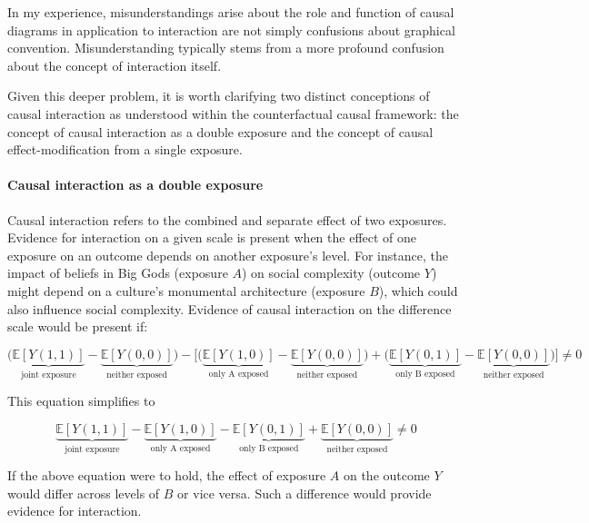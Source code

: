 \documentclass[
  singlecolumn,
  9pt]{article}
\let\oldparagraph\paragraph
\renewcommand{\paragraph}[1]{\oldparagraph{#1}\mbox{}}
\begin{document}
In my experience, misunderstandings arise about the role and function of
causal diagrams in application to interaction are not simply confusions
about graphical convention. Misunderstanding typically stems from a more
profound confusion about the concept of interaction itself.

Given this deeper problem, it is worth clarifying two distinct
conceptions of causal interaction as understood within the
counterfactual causal framework: the concept of causal interaction as a
double exposure and the concept of causal effect-modification from a
single exposure.

\paragraph{\texorpdfstring{\textbf{Causal interaction as a double
exposure}}{Causal interaction as a double exposure}}\label{causal-interaction-as-a-double-exposure}

Causal interaction refers to the combined and separate effect of two
exposures. Evidence for interaction on a given scale is present when the
effect of one exposure on an outcome depends on another exposure's
level. For instance, the impact of beliefs in Big Gods (exposure \(A\))
on social complexity (outcome \(Y\)) might depend on a culture's
monumental architecture (exposure \(B\)), which could also influence
social complexity. Evidence of causal interaction on the difference
scale would be present if:

\[\bigg(\underbrace{\mathbb{E}[Y(1,1)]}_{\text{joint exposure}} - \underbrace{\mathbb{E}[Y(0,0)]}_{\text{neither exposed}}\bigg) - \bigg[ \bigg(\underbrace{\mathbb{E}[Y(1,0)]}_{\text{only A exposed}} - \underbrace{\mathbb{E}[Y(0,0)]}_{\text{neither exposed}}\bigg) + \bigg(\underbrace{\mathbb{E}[Y(0,1)]}_{\text{only B exposed}} - \underbrace{\mathbb{E}[Y(0,0)]}_{\text{neither exposed}} \bigg)\bigg] \neq 0 \]

This equation simplifies to

\[ \underbrace{\mathbb{E}[Y(1,1)]}_{\text{joint exposure}} - \underbrace{\mathbb{E}[Y(1,0)]}_{\text{only A exposed}} - \underbrace{\mathbb{E}[Y(0,1)]}_{\text{only B exposed}} + \underbrace{\mathbb{E}[Y(0,0)]}_{\text{neither exposed}} \neq 0 \]

If the above equation were to hold, the effect of exposure \(A\) on the
outcome \(Y\) would differ across levels of \(B\) or vice versa. Such a
difference would provide evidence for interaction.
\end{document}

